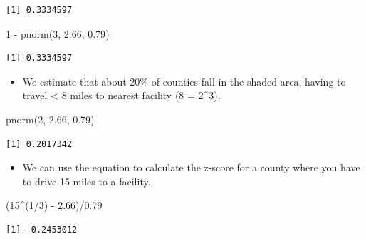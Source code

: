 \documentclass[
  letterpaper,
  DIV=11,
  numbers=noendperiod]{scrreprt}
\newenvironment{Shaded}{\begin{snugshade}}{\end{snugshade}}
\newcommand{\DecValTok}[1]{\textcolor[rgb]{0.68,0.00,0.00}{#1}}
\newcommand{\FloatTok}[1]{\textcolor[rgb]{0.68,0.00,0.00}{#1}}
\newcommand{\FunctionTok}[1]{\textcolor[rgb]{0.28,0.35,0.67}{#1}}
\newcommand{\NormalTok}[1]{\textcolor[rgb]{0.00,0.23,0.31}{#1}}
\newcommand{\SpecialCharTok}[1]{\textcolor[rgb]{0.37,0.37,0.37}{#1}}
\providecommand{\tightlist}{%
  \setlength{\itemsep}{0pt}\setlength{\parskip}{0pt}}\usepackage{longtable,booktabs,array}
\begin{document}
\begin{verbatim}
[1] 0.3334597
\end{verbatim}

\begin{Shaded}
\begin{Highlighting}[]
\DecValTok{1} \SpecialCharTok{{-}} \FunctionTok{pnorm}\NormalTok{(}\DecValTok{3}\NormalTok{, }\FloatTok{2.66}\NormalTok{, }\FloatTok{0.79}\NormalTok{)}
\end{Highlighting}
\end{Shaded}

\begin{verbatim}
[1] 0.3334597
\end{verbatim}

\begin{itemize}
\tightlist
\item
  We estimate that about 20\% of counties fall in the shaded area,
  having to travel \textless{} 8 miles to nearest facility (8 = 2\^{}3).
\end{itemize}

\begin{Shaded}
\begin{Highlighting}[]
\FunctionTok{pnorm}\NormalTok{(}\DecValTok{2}\NormalTok{, }\FloatTok{2.66}\NormalTok{, }\FloatTok{0.79}\NormalTok{)}
\end{Highlighting}
\end{Shaded}

\begin{verbatim}
[1] 0.2017342
\end{verbatim}

\begin{itemize}
\tightlist
\item
  We can use the equation to calculate the z-score for a county where
  you have to drive 15 miles to a facility.
\end{itemize}

\begin{Shaded}
\begin{Highlighting}[]
\NormalTok{(}\DecValTok{15}\SpecialCharTok{\^{}}\NormalTok{(}\DecValTok{1}\SpecialCharTok{/}\DecValTok{3}\NormalTok{) }\SpecialCharTok{{-}} \FloatTok{2.66}\NormalTok{)}\SpecialCharTok{/}\FloatTok{0.79}
\end{Highlighting}
\end{Shaded}

\begin{verbatim}
[1] -0.2453012
\end{verbatim}
\end{document}
